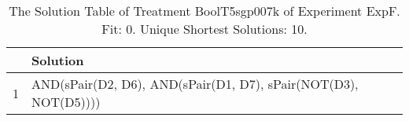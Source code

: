 \begin{table}[ht]
\centering
\begin{tabular}{rp{9cm}}
  \hline
 & Solution \\ 
  \hline
1 & AND(sPair(D2, D6), AND(sPair(D1, D7), sPair(NOT(D3), NOT(D5)))) \\ 
   \hline
\end{tabular}
\caption{The Solution Table of Treatment BoolT5sgp007k of Experiment ExpF. Fit: 0. Unique Shortest Solutions: 10.} 
\end{table}

